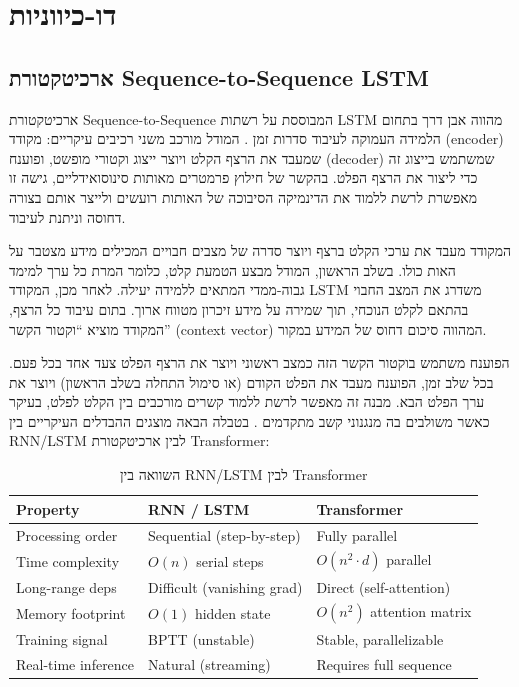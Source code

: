 \chapter{דו-כיווניות}

\section{ארכיטקטורת \textenglish{Sequence-to-Sequence LSTM}}

ארכיטקטורת \textenglish{Sequence-to-Sequence} המבוססת על רשתות \textenglish{LSTM} מהווה אבן דרך בתחום הלמידה העמוקה לעיבוד סדרות זמן \cite{valentini2019speech}. המודל מורכב משני רכיבים עיקריים: מקודד (\textenglish{encoder}) שמעבד את הרצף הקלט ויוצר ייצוג וקטורי מופשט, ופוענח (\textenglish{decoder}) שמשתמש בייצוג זה כדי ליצור את הרצף הפלט. בהקשר של חילוץ פרמטרים מאותות סינוסואידליים, גישה זו מאפשרת לרשת ללמוד את הדינמיקה הסיבוכה של האותות רועשים ולייצר אותם בצורה דחוסה וניתנת לעיבוד.

המקודד מעבד את ערכי הקלט ברצף ויוצר סדרה של מצבים חבויים המכילים מידע מצטבר על האות כולו. בשלב הראשון, המודל מבצע הטמעת קלט, כלומר המרת כל ערך למימד גבוה-ממדי המתאים ללמידה יעילה. לאחר מכן, המקודד \textenglish{LSTM} משדרג את המצב החבוי בהתאם לקלט הנוכחי, תוך שמירה על מידע זיכרון מטווח ארוך. בתום עיבוד כל הרצף, המקודד מוציא ``וקטור הקשר'' (\textenglish{context vector}) המהווה סיכום דחוס של המידע במקור.

הפוענח משתמש בוקטור הקשר הזה כמצב ראשוני ויוצר את הרצף הפלט צעד אחד בכל פעם. בכל שלב זמן, הפוענח מעבד את הפלט הקודם (או סימול התחלה בשלב הראשון) ויוצר את ערך הפלט הבא. מבנה זה מאפשר לרשת ללמוד קשרים מורכבים בין הקלט לפלט, בעיקר כאשר משולבים בה מנגנוני קשב מתקדמים \cite{park2024hybrid}. בטבלה הבאה מוצגים ההבדלים העיקריים בין \textenglish{RNN/LSTM} לבין ארכיטקטורת \textenglish{Transformer}:

\begin{table}[H]
\centering
\caption{השוואה בין \textenglish{RNN/LSTM} לבין \textenglish{Transformer}}
\label{tab:rnn_vs_transformer}
\begin{english}
\begin{tabular}{lll}
\toprule
\textbf{Property} & \textbf{RNN / LSTM} & \textbf{Transformer} \\
\midrule
Processing order   & Sequential (step-by-step)   & Fully parallel \\
Time complexity    & $O(n)$ serial steps         & $O(n^2 \cdot d)$ parallel \\
Long-range deps    & Difficult (vanishing grad)  & Direct (self-attention) \\
Memory footprint   & $O(1)$ hidden state         & $O(n^2)$ attention matrix \\
Training signal    & BPTT (unstable)             & Stable, parallelizable \\
Real-time inference & Natural (streaming)        & Requires full sequence \\
\bottomrule
\end{tabular}
\end{english}
\end{table}

